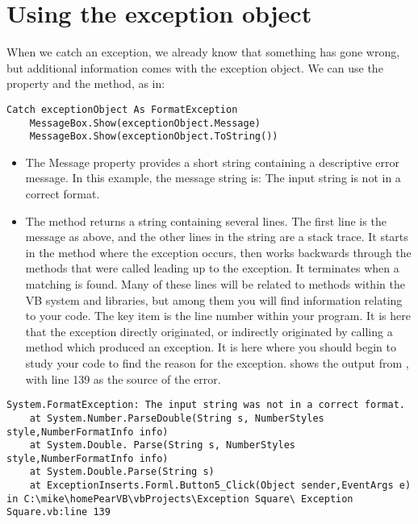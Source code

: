 	\section{Using the exception object}
	When we catch an exception, we already know that something has gone wrong, but additional information comes with the exception object. We can use the  property and the  method, as in:
		\begin{lstlisting}
Catch exceptionObject As FormatException
	MessageBox.Show(exceptionObject.Message)
	MessageBox.Show(exceptionObject.ToString())
		\end{lstlisting}
		\begin{itemize}
      \item The Message property provides a short string containing a descriptive error message. In this example, the message string is:
				The input string is not in a correct format.
			\item The  method returns a string containing several lines. The first line is the message as above, and the other lines in the string are a stack trace. It starts in the method where the exception occurs, then works backwards through the methods that were called leading up to the exception. It terminates when a matching  is found. Many of these lines will be related to methods within the VB system and libraries, but among them you will find information relating to your code. The key item is the line number within your program. It is here that the exception directly originated, or indirectly originated by calling a method which produced an exception. It is here where you should begin to study your code to find the reason for the exception.  shows the output from , with line 139 as the source of the error.
		\end{itemize}
		\begin{lstlisting}[label=lst:exceptions_example,caption=Sample result from \keyword{ToString} with an \keyword{Exception} object.]
System.FormatException: The input string was not in a correct format. 
	at System.Number.ParseDouble(String s, NumberStyles style,NumberFormatInfo info)
	at System.Double. Parse(String s, NumberStyles style,NumberFormatInfo info)
	at System.Double.Parse(String s)
	at ExceptionInserts.Forml.Button5_Click(Object sender,EventArgs e) in C:\mike\homePearVB\vbProjects\Exception Square\ Exception Square.vb:line 139
		\end{lstlisting}


